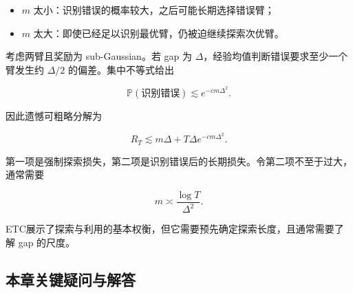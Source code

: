 \documentclass[
  11pt,
  a4paper,
]{ctexart}
\providecommand{\tightlist}{%
  \setlength{\itemsep}{0pt}\setlength{\parskip}{0pt}}
\begin{document}
\begin{itemize}
\tightlist
\item
  \(m\) 太小：识别错误的概率较大，之后可能长期选择错误臂；
\item
  \(m\) 太大：即使已经足以识别最优臂，仍被迫继续探索次优臂。
\end{itemize}

考虑两臂且奖励为 sub-Gaussian。若 gap 为
\(\Delta\)，经验均值判断错误要求至少一个臂发生约 \(\Delta/2\)
的偏差。集中不等式给出

\[
\mathbb P(\text{识别错误})
\lesssim e^{-cm\Delta^2}.
\]

因此遗憾可粗略分解为

\[
R_T
\lesssim
m\Delta+T\Delta e^{-cm\Delta^2}.
\]

第一项是强制探索损失，第二项是识别错误后的长期损失。令第二项不至于过大，通常需要

\[
m\asymp\frac{\log T}{\Delta^2}.
\]

ETC展示了探索与利用的基本权衡，但它需要预先确定探索长度，且通常需要了解
gap 的尺度。

\subsection{本章关键疑问与解答}\label{ux672cux7ae0ux5173ux952eux7591ux95ee-2}
\end{document}
